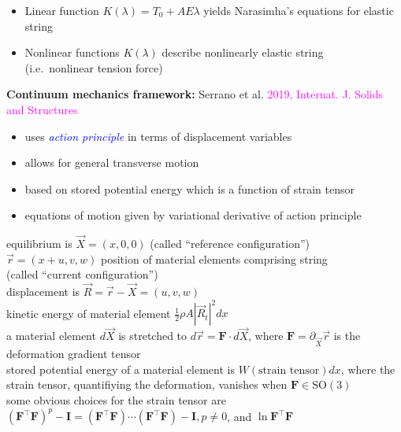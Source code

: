 \documentclass[landscape]{slides}
\def\myref#1{\textcolor{magenta}{\small #1}}
\def\myemph#1{\textcolor{blue}{\em #1}}
\begin{document}
\begin{itemize}
\item
Linear function $K(\lambda) = T_0 + AE\lambda$
yields Narasimha's equations for elastic string
\item
Nonlinear functions $K(\lambda)$ describe nonlinearly elastic string\\
(i.e.\ nonlinear tension force)
\end{itemize}

\newpage

\textbf{Continuum mechanics framework:}  
Serrano et al. \myref{2019, Internat. J. Solids and Structures}

\begin{itemize}
\item
uses \myemph{action principle} in terms of displacement variables
\item
allows for general transverse motion
\item 
based on stored potential energy which is a function of strain tensor
\item
equations of motion given by variational derivative of action principle
\end{itemize}
\hfil

equilibrium is $\vec{X} = (x,0,0)$ (called ``reference configuration'')
\\

$\vec{r} = (x+u,v,w)$ position of material elements comprising string\\
(called ``current configuration'')
\\

displacement is $\vec{R} = \vec{r} - \vec{X} = (u,v,w)$
\\

kinetic energy of material element $\tfrac{1}{2}\rho A |\vec{R}_t|^2 dx$
\\

a material element $d\vec{X}$ is stretched to  
$d\vec{r} 
= 
\mathbf{F} \cdot d\vec{X}$,
where 
$\mathbf{F} = \partial_{\vec{X}} \vec{r}$ is the deformation gradient tensor
\\

stored potential energy of a material element is
$W(\text{strain tensor})dx$,
where the strain tensor, quantifiying the deformation, vanishes when $\mathbf{F} \in \text{SO}(3)$
\\

some obvious choices for the strain tensor are 
$(\mathbf{F}^\top \mathbf{F})^p - \mathbf{I} 
= (\mathbf{F}^\top \mathbf{F}) \cdots (\mathbf{F}^\top \mathbf{F}) - \mathbf{I}, p \neq 0$,
and $\ln \mathbf{F}^\top \mathbf{F}$
\\
\end{document}
